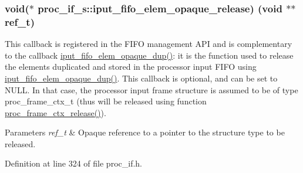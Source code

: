 \subsubsection[{\texorpdfstring{iput\+\_\+fifo\+\_\+elem\+\_\+opaque\+\_\+release}{iput_fifo_elem_opaque_release}}]{\setlength{\rightskip}{0pt plus 5cm}void($\ast$ proc\+\_\+if\+\_\+s\+::iput\+\_\+fifo\+\_\+elem\+\_\+opaque\+\_\+release) (void $\ast$$\ast$ref\+\_\+t)}\hypertarget{structproc__if__s_aec3bf948ff945ac2f5a4c834ea3b57da}{}\label{structproc__if__s_aec3bf948ff945ac2f5a4c834ea3b57da}
This callback is registered in the F\+I\+FO management A\+PI and is complementary to the callback \textquotesingle{}\hyperlink{structproc__if__s_a558cec57df436699d4154775894f2313}{iput\+\_\+fifo\+\_\+elem\+\_\+opaque\+\_\+dup()}\textquotesingle{}\+: it is the function used to release the elements duplicated and stored in the processor input F\+I\+FO using \textquotesingle{}\hyperlink{structproc__if__s_a558cec57df436699d4154775894f2313}{iput\+\_\+fifo\+\_\+elem\+\_\+opaque\+\_\+dup()}\textquotesingle{}. This callback is optional, and can be set to N\+U\+LL. In that case, the processor input frame structure is assumed to be of type proc\+\_\+frame\+\_\+ctx\+\_\+t (thus will be released using function \textquotesingle{}\hyperlink{proc__if_8c_afad6906a6da22ba369b736863c1e204e}{proc\+\_\+frame\+\_\+ctx\+\_\+release()}\textquotesingle{}). 
\begin{DoxyParams}{Parameters}
{\em ref\+\_\+t} & Opaque reference to a pointer to the structure type to be released. \\
\hline
\end{DoxyParams}


Definition at line 324 of file proc\+\_\+if.\+h.

